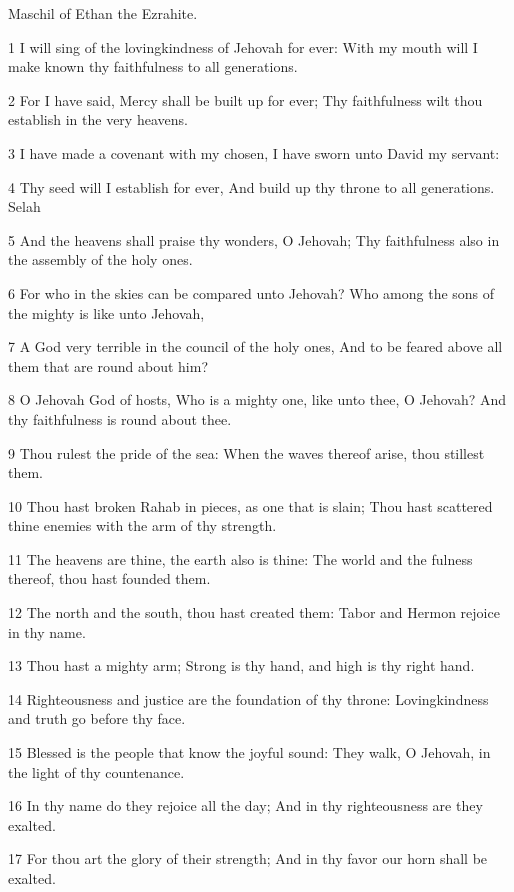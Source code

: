 \par Maschil of Ethan the Ezrahite.

\par 1 I will sing of the lovingkindness of Jehovah for ever: With my mouth will I make known thy faithfulness to all generations.
\par 2 For I have said, Mercy shall be built up for ever; Thy faithfulness wilt thou establish in the very heavens.
\par 3 I have made a covenant with my chosen, I have sworn unto David my servant:
\par 4 Thy seed will I establish for ever, And build up thy throne to all generations. Selah
\par 5 And the heavens shall praise thy wonders, O Jehovah; Thy faithfulness also in the assembly of the holy ones.
\par 6 For who in the skies can be compared unto Jehovah? Who among the sons of the mighty is like unto Jehovah,
\par 7 A God very terrible in the council of the holy ones, And to be feared above all them that are round about him?
\par 8 O Jehovah God of hosts, Who is a mighty one, like unto thee, O Jehovah? And thy faithfulness is round about thee.
\par 9 Thou rulest the pride of the sea: When the waves thereof arise, thou stillest them.
\par 10 Thou hast broken Rahab in pieces, as one that is slain; Thou hast scattered thine enemies with the arm of thy strength.
\par 11 The heavens are thine, the earth also is thine: The world and the fulness thereof, thou hast founded them.
\par 12 The north and the south, thou hast created them: Tabor and Hermon rejoice in thy name.
\par 13 Thou hast a mighty arm; Strong is thy hand, and high is thy right hand.
\par 14 Righteousness and justice are the foundation of thy throne: Lovingkindness and truth go before thy face.
\par 15 Blessed is the people that know the joyful sound: They walk, O Jehovah, in the light of thy countenance.
\par 16 In thy name do they rejoice all the day; And in thy righteousness are they exalted.
\par 17 For thou art the glory of their strength; And in thy favor our horn shall be exalted.
